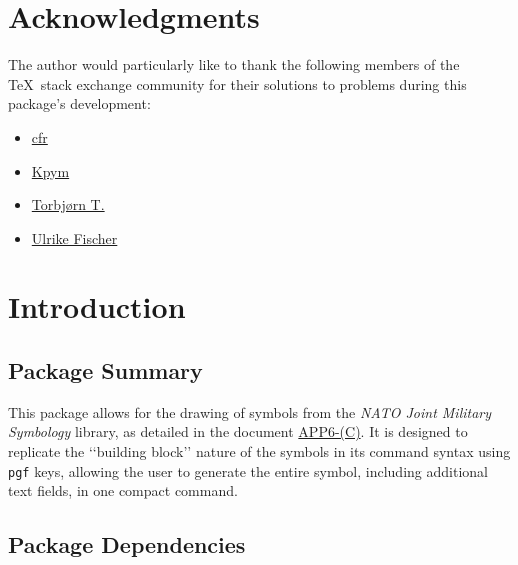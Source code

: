 \documentclass[a4paper, titlepage]{article}
\newcommand\DocLink{\href{https://www.awl.edu.pl/images/en/APP_6_C.pdf}{APP6-(C)}}
\begin{document}
\clearpage

\begin{versionhistory}
\renewcommand \vhAuthorColWidth{6cm}
\end{versionhistory}

\clearpage

\section*{Acknowledgments}

The author would particularly like to thank the following members of the \TeX\  stack exchange community for their solutions to problems during this package\rq{}s development:

\begin{itemize}
\item \href{https://tex.stackexchange.com/users/39222}{cfr}
\item \href{https://tex.stackexchange.com/users/9335}{Kpym}
\item \href{https://tex.stackexchange.com/users/586}{Torbj\o rn T.}
\item \href{https://tex.stackexchange.com/users/2388}{Ulrike Fischer}
\end{itemize}

\clearpage

\tableofcontents

\clearpage

\section{Introduction}

\subsection{Package Summary}

This package allows for the drawing of symbols from the \textit{NATO Joint Military Symbology} library, as detailed in the document \DocLink. It is designed to replicate the \lq\lq{}building block\rq\rq{} nature of the symbols in its command syntax using \texttt{pgf} keys, allowing the user to generate the entire symbol, including additional text fields, in one compact command.

\subsection{Package Dependencies}
\end{document}
